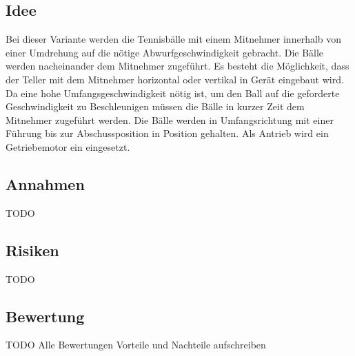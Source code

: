 \subsection{Idee}
Bei dieser Variante werden die Tennisbälle mit einem Mitnehmer innerhalb von einer Umdrehung auf die nötige Abwurfgeschwindigkeit gebracht. Die Bälle werden nacheinander dem Mitnehmer zugeführt. Es besteht die Möglichkeit, dass der Teller mit dem Mitnehmer horizontal oder vertikal in Gerät eingebaut wird. Da eine hohe Umfangsgeschwindigkeit nötig ist, um den Ball auf die geforderte Geschwindigkeit zu Beschleunigen müssen die Bälle in kurzer Zeit dem Mitnehmer zugeführt werden. Die Bälle werden in Umfangsrichtung mit einer Führung bis zur Abschussposition in Position gehalten. Als Antrieb wird ein Getriebemotor ein eingesetzt.  
\subsection{Annahmen}
TODO

\subsection{Risiken}
TODO

\subsection{Bewertung}
TODO Alle Bewertungen
Vorteile und Nachteile aufschreiben